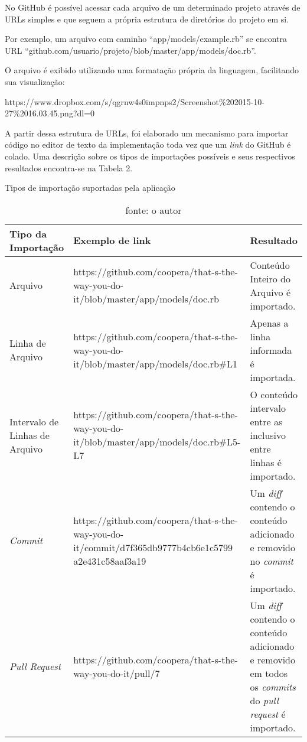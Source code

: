 No GitHub é possível acessar cada arquivo de um determinado projeto através de URLs simples e que seguem a própria estrutura de diretórios do projeto em si.

Por exemplo, um arquivo com caminho ``app/models/example.rb'' se encontra URL ``github.com/usuario/projeto/blob/master/app/models/doc.rb''.

O arquivo é exibido utilizando uma formatação própria da linguagem, facilitando sua visualização:

https://www.dropbox.com/s/qgrnw4s0impnps2/Screenshot\%202015-10-27\%2016.03.45.png?dl=0

A partir dessa estrutura de URLs, foi elaborado um mecanismo para importar código no editor de texto da implementação toda vez que um \textit{link} do GitHub é colado. Uma descrição sobre os tipos de importações possíveis e seus respectivos resultados encontra-se na Tabela 2.

\begin{table}[]
\centering
    \caption{Tipos de importação suportadas pela aplicação}
    \label{my-label}
    \begin{tabular}{p{3cm} | p{7cm} | p{5cm}}
    \hline
    Tipo da Importação & Exemplo de link & Resultado \\ \hline
    Arquivo & https://github.com/coopera/that-s-the-way-you-do-it/blob/master/app/models/doc.rb & Conteúdo Inteiro do Arquivo é importado. \\ \hline
    Linha de Arquivo & https://github.com/coopera/that-s-the-way-you-do-it/blob/master/app/models/doc.rb\#L1 & Apenas a linha informada é importada. \\ \hline
    Intervalo de Linhas de Arquivo & https://github.com/coopera/that-s-the-way-you-do-it/blob/master/app/models/doc.rb\#L5-L7 & O conteúdo intervalo entre as inclusivo entre linhas é importado. \\ \hline
    \textit{Commit} & https://github.com/coopera/that-s-the-way-you-do-it/commit/d7f365db9777b4cb6e1c5799 a2e431c58aaf3a19 & Um \textit{diff} contendo o conteúdo adicionado e removido no \textit{commit} é importado. \\ \hline
    \textit{Pull Request} & https://github.com/coopera/that-s-the-way-you-do-it/pull/7 & Um \textit{diff} contendo o conteúdo adicionado e removido em todos os \textit{commits} do \textit{pull request} é importado.  \\ \hline
\end{tabular}
\caption*{fonte: o autor}
\end{table}

